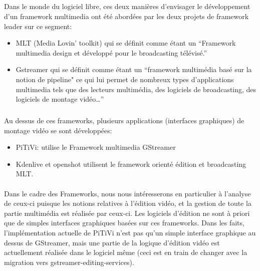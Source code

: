 \subparagraph{}

Dans le monde du logiciel libre, ces deux manières d'envisager le
développement d'un framework multimedia ont été abordées par les
deux projets de framework leader sur ce segment:

\begin {itemize}

  \item {MLT (Media Lovin' toolkit) qui se définit comme
  étant un ``Framework multimedia design
    et développé pour le broadcasting télévisé.''}

  \item {Gstreamer qui se définit comme étant un ``framework multimédia
    basé sur la notion de pipeline" ce qui lui permet de nombreux types
    d'applications multimedia tels que des lecteurs multimédia, des
    logiciels de broadcasting, des logiciels de montage vidéo\ldots''}

\end {itemize}

\subparagraph {}

Au dessus de ces frameworks, plusieurs applications (interfaces
graphiques) de montage vidéo se sont développées:

\begin {itemize}

  \item {PiTiVi: utilise le Framework multimedia GStreamer}

  \item {Kdenlive et openshot utilisent le framework
  orienté édition et broadcasting MLT.}

\end {itemize}

\paragraph {}

Dans le cadre des Frameworks, nous nous intéresserons en particulier
à l'analyse de ceux-ci puisque les notions relatives à l'édition
vidéo, et la gestion de toute la partie multimédia est réalisée
par ceux-ci. Les logiciels d'édition ne sont à priori que de simples
interfaces graphiques basées sur ces frameworks. Dans les faits,
l'implémentation actuelle de PiTiVi n'est pas qu'un simple interface
graphique au dessus de GStreamer, mais une partie de la logique
d'édition vidéo est actuellement réalisée dans le logiciel même
(ceci est en train de changer avec la migration \cite{PitviPortToGes}
vers gstreamer-editing-services\cite{PresentationOfGes}).


